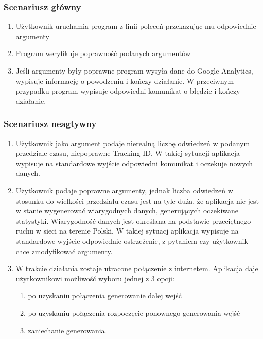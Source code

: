 \documentclass{article}
\begin{document}
\subsubsection{Scenariusz główny}
\begin{enumerate}
\item Użytkownik uruchamia program z linii poleceń przekazując mu odpowiednie argumenty
\item Program weryfikuje poprawność podanych argumentów
\item Jeśli argumenty były poprawne program wysyła dane do Google Analytics, wypisuje informację o powodzeniu i kończy działanie. W przeciwnym przypadku program wypisuje odpowiedni komunikat o błędzie i kończy działanie.
\end{enumerate}

\subsubsection{Scenariusz neagtywny}
\begin{enumerate}
	\item Użytkownik jako argument podaje nierealną liczbę odwiedzeń w podanym przedziale czasu, niepoprawne Tracking ID\@. W takiej sytuacji aplikacja wypisuje na standardowe wyjście odpowiedni komunikat i oczekuje nowych danych.

\item Użytkownik podaje poprawne argumenty, jednak liczba odwiedzeń w stosunku do wielkości przedziału czasu jest na tyle duża, że aplikacja nie jest w stanie wygenerować wiarygodnych danych, generujących oczekiwane statystyki. Wiarygodność danych jest określana na podstawie przeciętnego ruchu w sieci na terenie Polski. W takiej sytuacj aplikacja wypisuje na standardowe wyjście odpowiednie ostrzeżenie, z pytaniem czy użytkownik chce zmodyfikować argumenty.

\item W trakcie działania zostaje utracone połączenie z internetem. Aplikacja daje użytkownikowi możliwość wyboru jednej z 3 opcji:
\begin{enumerate}
\item po uzyskaniu połączenia generowanie dalej wejść
\item po uzyskaniu połączenia rozpoczęcie ponownego generowania wejść
\item zaniechanie generowania.
\end{enumerate}

\end{enumerate}
\end{document}
